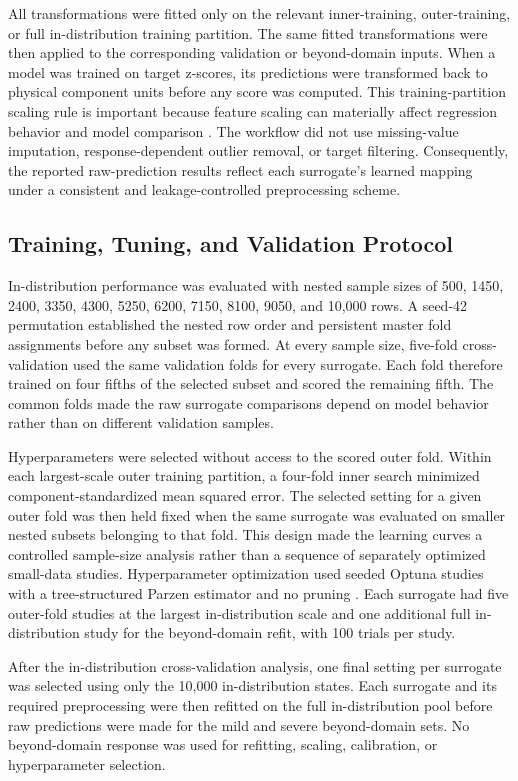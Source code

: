 \documentclass[12pt, twoside]{book}
\begin{document}
All transformations were fitted only on the relevant inner-training, outer-training, or full in-distribution
training partition. The same fitted transformations were then applied to the corresponding validation or
beyond-domain inputs. When a model was trained on target z-scores, its predictions were transformed back to
physical component units before any score was computed. This training-partition scaling rule is important
because feature scaling can materially affect regression behavior and model comparison \citep{Pinheiro2025}.
The workflow did not use missing-value
imputation, response-dependent outlier removal, or target filtering. Consequently, the reported raw-prediction
results reflect each surrogate's learned mapping under a consistent and leakage-controlled preprocessing
scheme.

\subsection{Training, Tuning, and Validation Protocol}

In-distribution performance was evaluated with nested sample sizes of 500, 1450, 2400, 3350, 4300, 5250,
6200, 7150, 8100, 9050, and 10,000 rows. A seed-42 permutation established the nested row order and persistent
master fold assignments before any subset was formed. At every sample size, five-fold cross-validation used
the same validation folds for every surrogate. Each fold therefore trained on four fifths of the selected
subset and scored the remaining fifth. The common folds made the raw surrogate comparisons depend on model
behavior rather than on different validation samples.

Hyperparameters were selected without access to the scored outer fold. Within each largest-scale outer
training partition, a four-fold inner search minimized component-standardized mean squared error. The selected
setting for a given outer fold was then held fixed when the same surrogate was evaluated on smaller nested
subsets belonging to that fold. This design made the learning curves a controlled sample-size analysis rather
than a sequence of separately optimized small-data studies. Hyperparameter optimization used seeded Optuna
studies with a tree-structured Parzen estimator and no pruning \citep{Akiba2019}. Each surrogate had five
outer-fold studies at the largest in-distribution scale and one additional full in-distribution study for the
beyond-domain refit, with 100 trials per study.

After the in-distribution cross-validation analysis, one final setting per surrogate was selected using only
the 10,000 in-distribution states. Each surrogate and its required preprocessing were then refitted on the full
in-distribution pool before raw predictions were made for the mild and severe beyond-domain sets. No
beyond-domain response was used for refitting, scaling, calibration, or hyperparameter selection.
\end{document}
